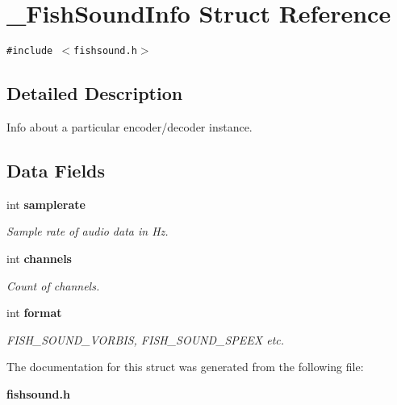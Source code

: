 \section{\_\-Fish\-Sound\-Info Struct Reference}
\label{struct__FishSoundInfo}
{\tt \#include $<$fishsound.h$>$}



\subsection{Detailed Description}
Info about a particular encoder/decoder instance. 

\subsection*{Data Fields}
\begin{CompactItemize}
\item 
int {\bf samplerate}\label{struct__FishSoundInfo_o0}

\begin{CompactList}\small\item\em Sample rate of audio data in Hz. \item\end{CompactList}\item 
int {\bf channels}\label{struct__FishSoundInfo_o1}

\begin{CompactList}\small\item\em Count of channels. \item\end{CompactList}\item 
int {\bf format}\label{struct__FishSoundInfo_o2}

\begin{CompactList}\small\item\em FISH\_\-SOUND\_\-VORBIS, FISH\_\-SOUND\_\-SPEEX etc. \item\end{CompactList}\end{CompactItemize}


The documentation for this struct was generated from the following file:\begin{CompactItemize}
\item 
{\bf fishsound.h}\end{CompactItemize}
